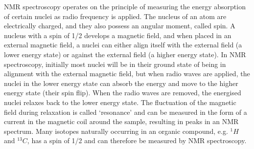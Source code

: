NMR spectroscopy operates on the principle of measuring the energy absorption of certain nuclei as radio frequency is applied. The nucleus of an atom are electrically charged, and they also possess an angular moment, called spin. A nucleus with a spin of 1/2 develops a magnetic field, and when placed in an external magnetic field, a nuclei can either align itself with the external field (a lower energy state) or against the external field (a higher energy state). In NMR spectroscopy, initially most nuclei will be in their ground state of being in alignment with the external magnetic field, but when radio waves are applied, the nuclei in the lower energy state can absorb the energy and move to the higher energy state (their spin flip). When the radio waves are removed, the energised nuclei relaxes back to the lower energy state. The fluctuation of the magnetic field during relaxation is called `resonance' and can be measured in the form of a current in the magnetic coil around the sample, resulting in peaks in an NMR spectrum. Many isotopes naturally occurring in an organic compound, e.g. $^{1}H$ and $^{13}C$,  has a spin of 1/2 and can therefore be measured by NMR spectroscopy. %

